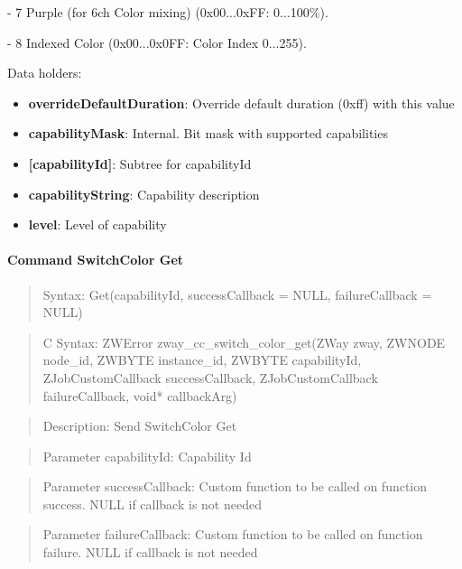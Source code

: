 - 7 Purple (for 6ch Color mixing) (0x00...0xFF: 0...100\%). 

- 8 Indexed Color (0x00...0x0FF: Color Index 0...255).
\newline

\noindent
Data holders:

\begin{itemize}
\item \textbf{overrideDefaultDuration}: Override default duration (0xff) with this value
\item \textbf{capabilityMask}: Internal. Bit mask with supported capabilities
\item \textbf{[capabilityId]}: Subtree for capabilityId
\item \qquad\textbf{capabilityString}: Capability description
\item \qquad\textbf{level}: Level of capability
\end{itemize}

\paragraph{Command SwitchColor Get}
\begin{quote}Syntax: Get(capabilityId, successCallback = NULL, failureCallback = NULL)\end{quote}
\begin{quote}C Syntax: ZWError zway\_cc\_switch\_color\_get(ZWay zway, ZWNODE node\_id, ZWBYTE instance\_id, ZWBYTE capabilityId, ZJobCustomCallback successCallback, ZJobCustomCallback failureCallback, void* callbackArg)\end{quote}
\begin{quote}Description: Send SwitchColor Get\end{quote}
\begin{quote}Parameter capabilityId: Capability Id\end{quote}
\begin{quote}Parameter successCallback: Custom function to be called on function success. NULL if callback is not needed\end{quote}
\begin{quote}Parameter failureCallback: Custom function to be called on function failure. NULL if callback is not needed\end{quote}


